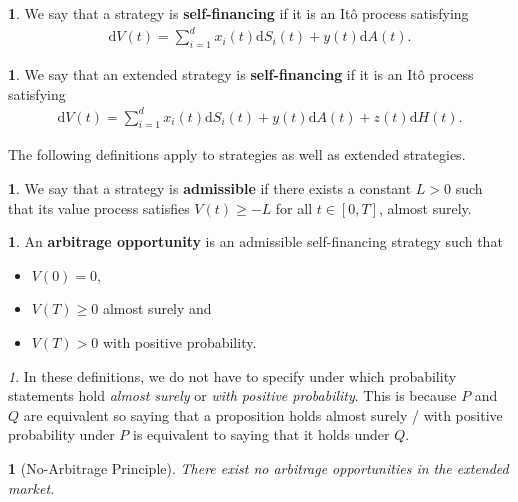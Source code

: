 \documentclass[english]{article}
\numberwithin{equation}{section}
\numberwithin{figure}{section}
\theoremstyle{bolddescit}
\theoremstyle{definition}
\newtheorem{definition}[theorem]{\protect\definitionname}
\theoremstyle{definition}
\theoremstyle{plain}
\theoremstyle{plain}
\theoremstyle{bolddesc}
\newtheorem{assumption}[theorem]{\protect\assumptionname}
\theoremstyle{plain}
\theoremstyle{remark}
\newtheorem{remark}[theorem]{\protect\remarkname}
\providecommand{\assumptionname}{Assumption}
\providecommand{\definitionname}{Definition}
\providecommand{\remarkname}{Remark}
\begin{document}
\begin{definition}
  We say that a strategy is \textbf{self-financing} if it is an It\^o process satisfying
  \begin{align*}
    \mathrm{d}V(t) = \sum_{i=1}^d x_i(t) \mathrm{d}S_i(t) + y(t) \mathrm{d}A(t).
  \end{align*}
\end{definition}

\begin{definition}
  We say that an extended strategy is \textbf{self-financing} if it is an It\^o process satisfying
  \begin{align*}
    \mathrm{d}V(t) = \sum_{i=1}^d x_i(t) \mathrm{d}S_i(t) + y(t) \mathrm{d}A(t) + z(t) \mathrm{d}H(t).
  \end{align*}
\end{definition}

The following definitions apply to strategies as well as extended strategies.

\begin{definition}
  We say that a strategy is \textbf{admissible} if there exists a constant $L > 0$ such that its value process satisfies $V(t) \ge -L$ for all $t \in [0,T]$, almost surely.
\end{definition}

\begin{definition}
  An \textbf{arbitrage opportunity} is an admissible self-financing strategy such that
  \begin{itemize}
    \item $V(0) = 0$,
    \item $V(T) \ge 0$ almost surely and
    \item $V(T) > 0$ with positive probability.
  \end{itemize}
\end{definition}

\begin{remark}
  In these definitions, we do not have to specify under which probability statements hold \textit{almost surely} or \textit{with positive probability}. This is because $P$ and $Q$ are equivalent so saying that a proposition holds almost surely / with positive probability under $P$ is equivalent to saying that it holds under $Q$.
\end{remark}

\begin{assumption}[No-Arbitrage Principle]\label{ass:no-arbitrage-principle}
  There exist no arbitrage opportunities in the extended market.
\end{assumption}
\end{document}
